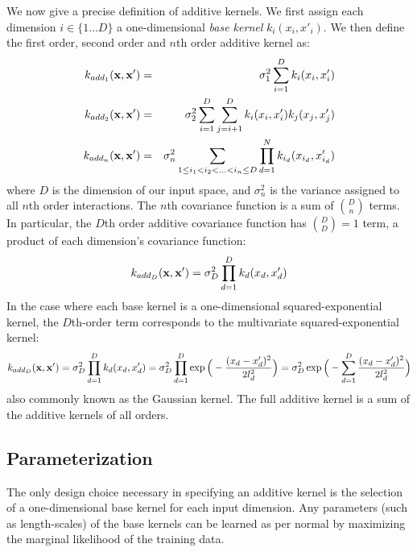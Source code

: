 We now give a precise definition of additive kernels.  We first assign each dimension $i \in \{1 \dots D\}$ a one-dimensional \emph{base kernel} $k_i(x_i, x'_i)$.  We then define the first order, second order and $n$th order additive kernel as:
\begin{eqnarray}
k_{add_1}({\bf x, x'}) & = & \sigma_1^2 \sum_{i=1}^D k_i(x_i, x_i') \\
k_{add_2}({\bf x, x'}) & = & \sigma_2^2 \sum_{i=1}^D \sum_{j = i + 1}^D k_i(x_i, x_i') k_j(x_j, x_j') \\
k_{add_n}({\bf x, x'}) & = & \sigma_n^2 \sum_{1 \leq i_1 < i_2 < ... < i_n \leq D} \prod_{d=1}^N k_{i_d}(x_{i_d}, x_{i_d}')
\end{eqnarray}
where $D$ is the dimension of our input space, and $\sigma_n^2$ is the variance assigned to all $n$th order interactions. The $n$th covariance function is a sum of ${D \choose n}$ terms.  In particular, the $D$th order additive covariance function has ${D \choose D} = 1$ term, a product of each dimension's covariance function:
\begin{equation}
k_{add_D}({\bf x, x'}) = \sigma_D^2 \prod_{d=1}^D k_{d}(x_{d}, x_{d}')
\end{equation}
In the case where each base kernel is a one-dimensional squared-exponential kernel, the $D$th-order term corresponds to the multivariate squared-exponential kernel:
\begin{equation}
k_{add_D}({\bf x, x'}) = \sigma_D^2 \prod_{d=1}^D k_{d}(x_{d}, x_{d}') = \sigma_D^2 \prod_{d=1}^D \exp \Big( -\frac{ ( x_{d} - x_{d}')^2}{2l^2_d} \Big) = \sigma_D^2  \exp \Big( -\sum_{d=1}^D \frac{ ( x_{d} - x_{d}')^2}{2l^2_d} \Big)
\end{equation}
also commonly known as the Gaussian kernel.  The full additive kernel is a sum of the additive kernels of all orders.
%
\subsection{Parameterization}

The only design choice necessary in specifying an additive kernel is the selection of a one-dimensional base kernel for each input dimension.  Any parameters (such as length-scales) of the base kernels can be learned as per normal by maximizing the marginal likelihood of the training data.  

